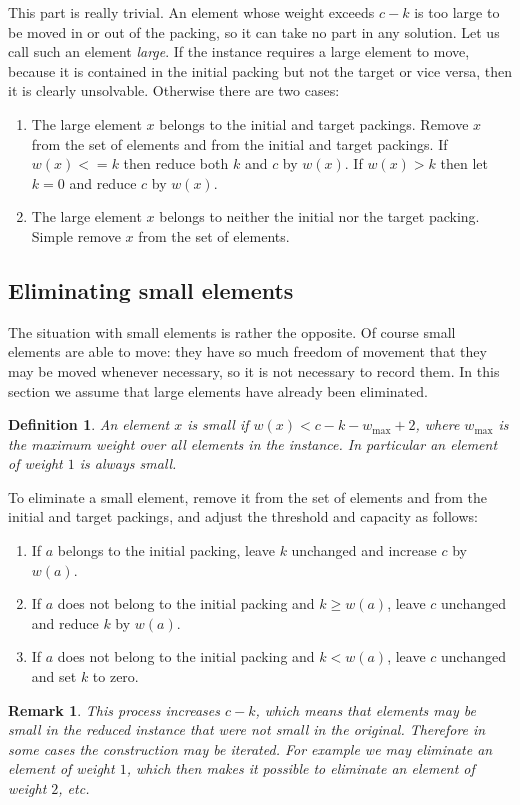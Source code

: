 \documentclass{robinminion}
\newtheorem{rem}[prop]{Remark}
\newtheorem*{definition}{Definition}
\begin{document}
\noindent This part is really trivial. An element whose weight exceeds $c-k$ is too large to be moved in or out
of the packing, so it can take no part in any solution. Let us call such an element \emph{large}. If the instance
requires a large element to move, because it is contained in the initial packing but not the target or vice versa,
then it is clearly unsolvable. Otherwise there are two cases:
\begin{enumerate}
    \item The large element $x$ belongs to the initial and target packings. Remove $x$ from the set of elements and
    from the initial and target packings. If $w(x) <= k$ then reduce both $k$ and $c$ by $w(x)$. If $w(x) > k$ then
    let $k=0$ and reduce $c$ by $w(x)$.
    \item The large element $x$ belongs to neither the initial nor the target packing. Simple remove $x$ from the set of elements.
\end{enumerate}

\subsection*{Eliminating small elements}

\noindent The situation with small elements is rather the opposite. Of course small elements are able to move:
they have so much freedom of movement that they may be moved whenever necessary, so it is not necessary to
record them. In this section we assume that large elements have already been eliminated.

\begin{definition}\label{def:small}
    An element $x$ is \emph{small} if $w(x) < c-k-w_{\mathrm{max}} + 2$, where $w_{\mathrm{max}}$ is the
    maximum weight over all elements in the instance. In particular an element of weight $1$ is always small.
\end{definition}

\noindent To eliminate a small element, remove it from the set of elements and from the initial and target packings,
and adjust the threshold and capacity as follows:
\begin{enumerate}
    \item If $a$ belongs to the initial packing, leave $k$ unchanged and increase $c$ by $w(a)$.
    \item If $a$ does not belong to the initial packing and $k \geq w(a)$, leave $c$ unchanged and
            reduce $k$ by $w(a)$.
    \item If $a$ does not belong to the initial packing and $k < w(a)$, leave $c$ unchanged and set $k$ to zero.
\end{enumerate}



\begin{rem}
    This process increases $c-k$, which means that elements may be small in the reduced
    instance that were not small in the original. Therefore in some cases the construction may be iterated.
    For example we may eliminate an element of weight $1$, which then makes it possible to eliminate an
    element of weight $2$, etc.
\end{rem}
\end{document}
